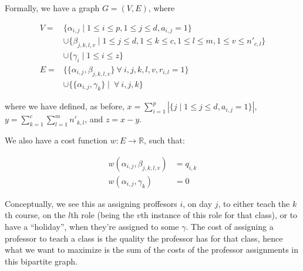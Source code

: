 \begin{center}
\end{center}

Formally, we have a graph $G = (V, E)$, where

\begin{align*}
  V = & \{\alpha_{i, j} \mid 1 \le i \le p, 1 \le j \le d, a_{i, j} = 1\}\\
    & \cup \{\beta_{j, k, l, v} \mid 1 \le j \le d, 1 \le k \le c, 1 \le l \le m, 1 \le v \le n'_{c, l}\}\\
    & \cup \{\gamma_i \mid 1 \le i \le z\}\\
  E = & \{\{\alpha_{i, j}, \beta_{j, k, l, v}\}\ \forall\ i, j, k, l, v, r_{i, l} = 1\}\\
      & \cup \{\{\alpha_{i, j}, \gamma_k\} \mid \ \forall\ i, j, k\}
\end{align*}

where we have defined, as before, $x = \sum_{i = 1}^p |\{j \mid 1 \le j \le d, a_{i, j} = 1\}|$, $y = \sum_{k = 1}^c \sum_{l = 1}^m n'_{k, l}$, and $z = x - y$.

We also have a cost function $w:E \to \mathbb{R}$, such that:

\begin{align*}
  w(\alpha_{i, j}, \beta_{j, k, l, v}) &= q_{i, k}\\
  w(\alpha_{i, j}, \gamma_k) &= 0
\end{align*}

Conceptually, we see this as assigning proffesors $i$, on day $j$, to either teach the $k$th course, on the $l$th role (being the $v$th instance of this role for that class), or to have a ``holiday'', when they're assigned to some $\gamma$. The cost of assigning a professor to teach a class is the quality the professor has for that class, hence what we want to maximize is the sum of the costs of the professor assignments in this bipartite graph.

